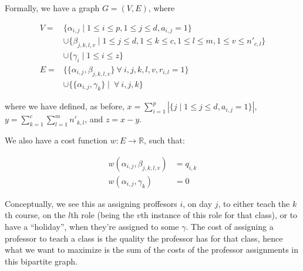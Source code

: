 \begin{center}
\end{center}

Formally, we have a graph $G = (V, E)$, where

\begin{align*}
  V = & \{\alpha_{i, j} \mid 1 \le i \le p, 1 \le j \le d, a_{i, j} = 1\}\\
    & \cup \{\beta_{j, k, l, v} \mid 1 \le j \le d, 1 \le k \le c, 1 \le l \le m, 1 \le v \le n'_{c, l}\}\\
    & \cup \{\gamma_i \mid 1 \le i \le z\}\\
  E = & \{\{\alpha_{i, j}, \beta_{j, k, l, v}\}\ \forall\ i, j, k, l, v, r_{i, l} = 1\}\\
      & \cup \{\{\alpha_{i, j}, \gamma_k\} \mid \ \forall\ i, j, k\}
\end{align*}

where we have defined, as before, $x = \sum_{i = 1}^p |\{j \mid 1 \le j \le d, a_{i, j} = 1\}|$, $y = \sum_{k = 1}^c \sum_{l = 1}^m n'_{k, l}$, and $z = x - y$.

We also have a cost function $w:E \to \mathbb{R}$, such that:

\begin{align*}
  w(\alpha_{i, j}, \beta_{j, k, l, v}) &= q_{i, k}\\
  w(\alpha_{i, j}, \gamma_k) &= 0
\end{align*}

Conceptually, we see this as assigning proffesors $i$, on day $j$, to either teach the $k$th course, on the $l$th role (being the $v$th instance of this role for that class), or to have a ``holiday'', when they're assigned to some $\gamma$. The cost of assigning a professor to teach a class is the quality the professor has for that class, hence what we want to maximize is the sum of the costs of the professor assignments in this bipartite graph.

